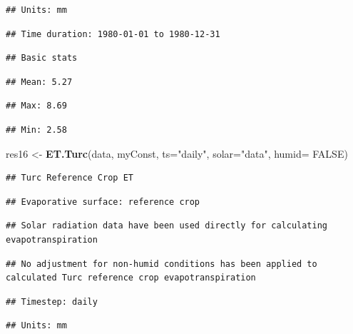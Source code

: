 \documentclass[
]{book}
\newenvironment{Shaded}{\begin{snugshade}}{\end{snugshade}}
\newcommand{\DataTypeTok}[1]{\textcolor[rgb]{0.13,0.29,0.53}{#1}}
\newcommand{\KeywordTok}[1]{\textcolor[rgb]{0.13,0.29,0.53}{\textbf{#1}}}
\newcommand{\NormalTok}[1]{#1}
\newcommand{\OtherTok}[1]{\textcolor[rgb]{0.56,0.35,0.01}{#1}}
\newcommand{\StringTok}[1]{\textcolor[rgb]{0.31,0.60,0.02}{#1}}
\begin{document}
\begin{verbatim}
## Units: mm
\end{verbatim}

\begin{verbatim}
## Time duration: 1980-01-01 to 1980-12-31
\end{verbatim}

\begin{verbatim}
## Basic stats
\end{verbatim}

\begin{verbatim}
## Mean: 5.27
\end{verbatim}

\begin{verbatim}
## Max: 8.69
\end{verbatim}

\begin{verbatim}
## Min: 2.58
\end{verbatim}

\begin{Shaded}
\begin{Highlighting}[]
\NormalTok{res16 <-}\StringTok{ }\KeywordTok{ET.Turc}\NormalTok{(data, myConst, }\DataTypeTok{ts=}\StringTok{"daily"}\NormalTok{, }\DataTypeTok{solar=}\StringTok{"data"}\NormalTok{, }\DataTypeTok{humid=} \OtherTok{FALSE}\NormalTok{)}
\end{Highlighting}
\end{Shaded}

\begin{verbatim}
## Turc Reference Crop ET
\end{verbatim}

\begin{verbatim}
## Evaporative surface: reference crop
\end{verbatim}

\begin{verbatim}
## Solar radiation data have been used directly for calculating evapotranspiration
\end{verbatim}

\begin{verbatim}
## No adjustment for non-humid conditions has been applied to calculated Turc reference crop evapotranspiration
\end{verbatim}

\begin{verbatim}
## Timestep: daily
\end{verbatim}

\begin{verbatim}
## Units: mm
\end{verbatim}
\end{document}
